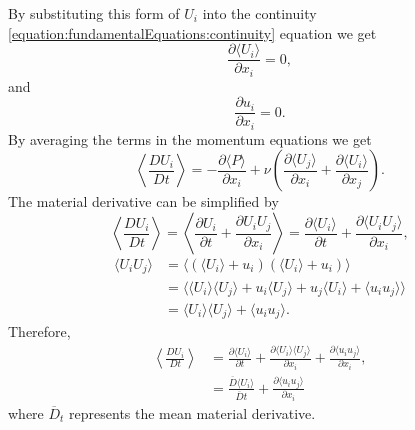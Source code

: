\documentclass[12pt,oneside,a4paper]{article}
\newcommand{\pdev}[2]{\frac{\partial {#1}}{\partial {#2}}}
\newcommand{\Ddev}[2]{\frac{D {#1}}{D {#2}}}
\begin{document}
By substituting this form of $U_i$ into the continuity \eqref{equation:fundamentalEquations:continuity} equation we get
\begin{equation}
\pdev{\langle U_i\rangle}{x_i}=0,
\label{equation:fundamentalEquations:meanContinuity}
\end{equation}
and
\begin{equation}
\pdev{u_i}{x_i}=0.
\label{equation:fundamentalEquations:flucContinuity}
\end{equation}
By averaging the terms in the momentum equations we get
\begin{equation}
\left\langle \Ddev{U_i}{t} \right\rangle
=
-\pdev{\langle P \rangle}{x_i}
+
\nu
	\left(
	\pdev{\langle U_j \rangle}{x_i}
	+
	\pdev{\langle U_i \rangle}{x_j} 
	\right).
\label{equation:fundamentalEquations:averagedMom}
\end{equation}
The material derivative can be simplified by
\begin{equation}
\left\langle \Ddev{U_i}{t} \right\rangle
=
\left\langle
	\pdev{U_i}{t} + \pdev{U_i U_j}{x_i}
\right\rangle
=
\pdev{\langle U_i\rangle}{t}
+
\pdev{\langle U_i U_j\rangle}{x_i},
\end{equation}
\begin{align}
\langle U_i U_j\rangle 
&=
\langle
	(\langle U_i \rangle + u_i)(\langle U_i \rangle + u_i)
\rangle \\
&=
\langle
	\langle U_i \rangle \langle U_j \rangle
	+
	u_i \langle U_j \rangle
	+
	u_j \langle U_i \rangle
	+
	\langle u_i u_j \rangle
\rangle\\
&=
\langle U_i \rangle \langle U_j \rangle
+
\langle u_i u_j \rangle.
\end{align}
Therefore,
\begin{align}
\left\langle \Ddev{U_i}{t} \right\rangle
&=
\pdev{\langle U_i\rangle}{t} 
+
\pdev{\langle U_i\rangle \langle U_j\rangle}{x_i}
+
\pdev{\langle u_i u_j\rangle}{x_i},\\
&=
\frac{\overline{D} \langle U_i \rangle }{ \overline{D} t}
+ 
\pdev{\langle u_i u_j\rangle}{x_i}
\end{align}
where $\overline{D}_t$ represents the mean material derivative. 
\end{document}
